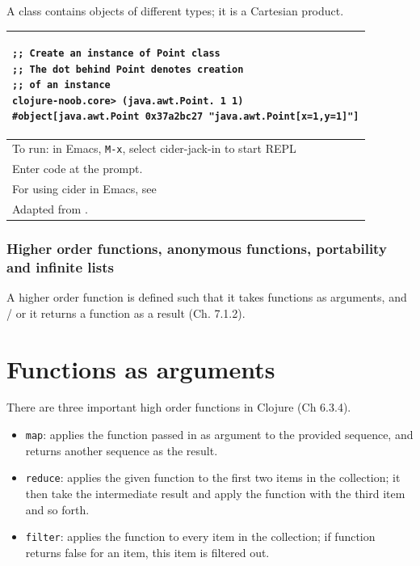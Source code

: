 \documentclass[12pt]{article}
\begin{document}
A class contains objects of different types; it is a Cartesian product.


\begin{tabular}{|p{}|}
\hline
\begin{verbatim}
;; Create an instance of Point class
;; The dot behind Point denotes creation 
;; of an instance 
clojure-noob.core> (java.awt.Point. 1 1)
#object[java.awt.Point 0x37a2bc27 "java.awt.Point[x=1,y=1]"]
\end{verbatim}
\\
\hline
To run: in Emacs, \texttt{M-x}, select cider-jack-in to start REPL\\
Enter code at the prompt.\\
For using cider in Emacs, see \cite{brave2015}\\
\hline
Adapted from \cite{fogus2014joy}.\\
\hline
\end{tabular}



\section{Higher order functions, anonymous functions, portability and infinite lists}

A higher order function is defined such that it takes functions as arguments, and / or it returns a function as a result \cite{fogus2014joy} (Ch. 7.1.2).

\part{Functions as arguments}

There are three important high order functions in Clojure \cite{fogus2014joy} (Ch 6.3.4). 

\begin{itemize}
\item \texttt{map}:  applies the function passed in as argument to the provided sequence, and returns another sequence as the result. 
\item \texttt{reduce}:  applies the given function to the first two items in the collection; it then take the intermediate result and apply the function with the third item and so forth.
\item \texttt{filter}: applies the function to every item in the collection; if function returns false for an item, this item is filtered out.
\end{itemize}
\end{document}

